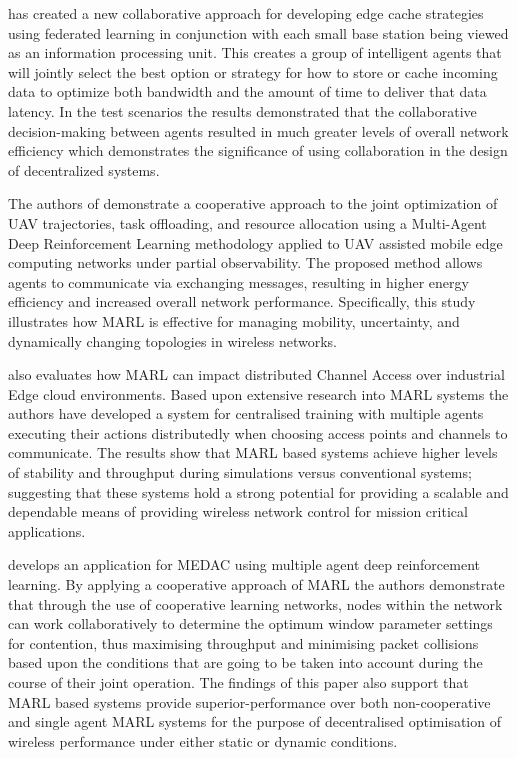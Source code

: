 \documentclass[a4paper,fleqn]{cas-dc}
\numberwithin{equation}{section}
\begin{document}
\cite{wu2024cooperative} has created a new collaborative approach for developing edge cache strategies using federated learning in conjunction with each small base station being viewed as an information processing unit. This creates a group of intelligent agents that will jointly select the best option or strategy for how to store or cache incoming data to optimize both bandwidth and the amount of time to deliver that data latency. In the test scenarios the results demonstrated that the collaborative decision-making between agents resulted in much greater levels of overall network efficiency which demonstrates the significance of using collaboration in the design of decentralized systems.

The authors of \cite{kim2024cooperative} demonstrate a cooperative approach to the joint optimization of UAV trajectories, task offloading, and resource allocation using a Multi-Agent Deep Reinforcement Learning  methodology applied to UAV assisted mobile edge computing networks under partial observability. The proposed method allows agents to communicate via exchanging messages, resulting in higher energy efficiency and increased overall network performance. Specifically, this study illustrates how MARL is effective for managing mobility, uncertainty, and dynamically changing topologies in wireless networks.

\cite{yang2024multiagent} also evaluates how MARL can impact distributed Channel Access over industrial Edge cloud environments. Based upon extensive research into MARL systems the authors have developed a system for centralised training with multiple agents executing their actions distributedly when choosing access points and channels to communicate. The results show that MARL based systems achieve higher levels of stability and throughput during simulations versus conventional systems; suggesting that these systems hold a strong potential for providing a scalable and dependable means of providing wireless network control for mission critical applications.

\cite{ke2023applying} develops an application for MEDAC using multiple agent deep reinforcement learning. By applying a cooperative approach of MARL the authors demonstrate that through the use of cooperative learning networks, nodes within the network can work collaboratively to determine the optimum window parameter settings for contention, thus maximising throughput and minimising packet collisions based upon the conditions that are going to be taken into account during the course of their joint operation. The findings of this paper also support that MARL based systems provide superior-performance over both non-cooperative and single agent MARL systems for the purpose of decentralised  optimisation of wireless performance under either static or dynamic conditions.
\end{document}
